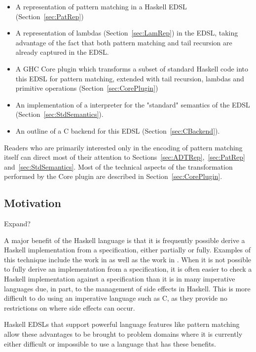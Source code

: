 \documentclass[sigplan,anonymous,review]{acmart}
\newenvironment{todont}
               {\comment}
               {\endcomment}
\begin{document}
\begin{itemize}
  \item A representation of pattern matching in a Haskell EDSL (Section~\ref{sec:PatRep})
  \item A representation of lambdas (Section~\ref{sec:LamRep}) in the EDSL, taking advantage of
  the fact that both pattern matching and tail recursion are already captured in
  the EDSL.
\item A GHC Core plugin which transforms a subset of standard Haskell code
  into this EDSL for pattern matching, extended with tail recursion,
  lambdas and primitive operations (Section~\ref{sec:CorePlugin})
\item An implementation of a interpreter for the "standard" semantics of the EDSL (Section~\ref{sec:StdSemantics}).
\item An outline of a C backend for this EDSL (Section~\ref{sec:CBackend}).
\end{itemize}

Readers who are primarily interested only in the encoding of pattern matching itself can direct
most of their attention to Sections~\ref{sec:ADTRep},~\ref{sec:PatRep} and~\ref{sec:StdSemantics}. Most of the technical aspects of
the transformation performed by the Core plugin are described in Section~\ref{sec:CorePlugin}.

\subsection{Motivation}

\begin{todont}
  Expand?
\end{todont}

A major benefit of the Haskell language is that it is frequently possible derive
a Haskell implementation from a specification, either partially or fully.
Examples of this technique include the work in \cite{Elliott-2018-ad-icfp} as
well as the work in \cite{Elliott2019-convolution-extended}.  When it is not
possible to fully derive an implementation from a specification, it is often
easier to check a Haskell implementation against a specification than it is in
many imperative languages due, in part, to the management of side effects in
Haskell. This is more difficult to do using an imperative language such as C, as
they provide no restrictions on where side effects can occur.

\newpage
Haskell EDSLs that support powerful language features like pattern matching
allow these advantages to be brought to problem domains where it is currently
either difficult or impossible to use a language that has these benefits.
\end{document}
